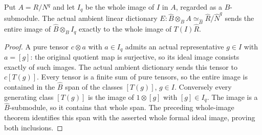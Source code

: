\begin{theorem}
\label{hir:actual-relative-formal-tensor-ideal-image}
\leanok
Put $A=R/N^q$ and let $I_q$ be the whole image of $I$ in $A$,
regarded as a $B$-submodule. The actual ambient linear dictionary
$E:\widehat B\otimes_B A\simeq_{\widehat B}\widehat R/\widehat N^q$
sends the entire image of $\widehat B\otimes_B I_q$ exactly to the
whole image of $T(I)\widehat R$.
\end{theorem}
\begin{proof}
A pure tensor $c\otimes a$ with $a\in I_q$ admits an actual
representative $g\in I$ with $a=[g]$: the original quotient map is
surjective, so its ideal image consists exactly of such images.
The actual ambient dictionary sends this tensor to $c[T(g)]$.
Every tensor is a finite sum of pure tensors, so the entire image
is contained in the $\widehat B$ span of the classes $[T(g)]$,
$g\in I$. Conversely every generating class $[T(g)]$ is the image
of $1\otimes[g]$ with $[g]\in I_q$. The image is a
$\widehat B$-submodule, so it contains that whole span. The preceding
whole-image theorem identifies this span with the asserted whole
formal ideal image, proving both inclusions.
\end{proof}

